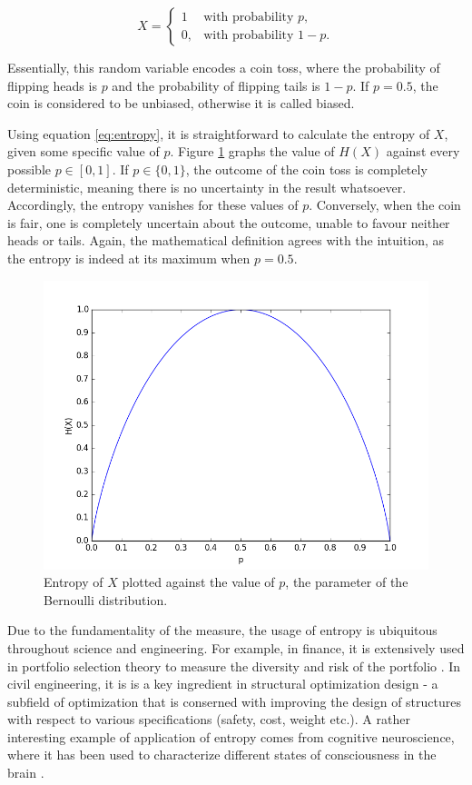 \documentclass[12pt]{article}
\begin{document}
$$X = \begin{cases} 1 & \mbox{with probability } p, \\ 0, & \mbox{with probability } 1-p. \end{cases}$$

Essentially, this random variable encodes a coin toss, where the probability of flipping heads is $p$ and the probability of flipping tails is $1-p$. If $p=0.5$, the coin is considered to be unbiased, otherwise it is called biased.

Using equation \ref{eq:entropy}, it is straightforward to calculate the entropy of $X$, given some specific value of $p$. Figure \ref{fig:entropy} graphs the value of $H(X)$ against every possible $p \in \left[ 0, 1 \right]$. If $p \in \{0, 1\}$, the outcome of the coin toss is completely deterministic, meaning there is no uncertainty in the result whatsoever. Accordingly, the entropy vanishes for these values of $p$. Conversely, when the coin is fair, one is completely uncertain about the outcome, unable to favour neither heads or tails. Again, the mathematical definition agrees with the intuition, as the entropy is indeed at its maximum when $p = 0.5$.

\begin{figure} [h]
\begin{center}
\includegraphics[width=.9\textwidth]{entropy}
\caption{Entropy of $X$ plotted against the value of $p$, the parameter of the Bernoulli distribution.}
\label{fig:entropy}
\end{center}
\end{figure}

Due to the fundamentality of the measure, the usage of entropy is ubiquitous throughout science and engineering. For example, in finance, it is extensively used in portfolio selection theory to measure the diversity and risk of the portfolio \cite{entropy-finance}. In civil engineering, it is is a key ingredient in structural optimization design \cite{entropy-civil-eng} - a subfield of optimization that is conserned with improving the design of structures with respect to various specifications (safety, cost, weight etc.). A rather interesting example of application of entropy comes from cognitive neuroscience, where it has been used to characterize different states of consciousness in the brain \cite{entropy-consciousness}.
\end{document}
